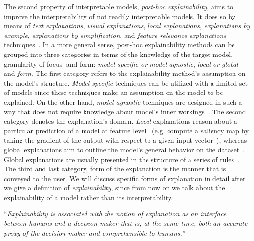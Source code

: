 The second property of interpretable models, \emph{post-hoc explainability}, aims to improve the interpretability of not readily interpretable models. It does so by means of \emph{text explanations}, \emph{visual explanations}, \emph{local explanations}, \emph{explanations by example},
\emph{explanations by simplification}, and \emph{feature relevance explanations} techniques~\parencite{TheMythosOfModelInterpretability_Lipton, XAIConceptsTaxonomies_Arrieta}. In a more general sense, post-hoc explainability methods can be grouped into three categories in terms of the knowledge of the target model, granularity of focus, and form: \emph{model-specific or model-agnostic}, \emph{local or global} and \emph{form}. The first category refers to the explainability method's assumption on the model's structure. \emph{Model-specific} techniques can be utilized with a limited set of models since these techniques make an assumption on the model to be explained. On the other hand, \emph{model-agnostic} techniques are designed in such a way that does not require knowledge about model's inner workings~\parencite{XAIConceptsTaxonomies_Arrieta,ASurveyOfMethodsForExplainingBlackBoxModels_Guidotti}. The second category denotes the explanation's domain. \emph{Local} explanations reason about a particular prediction of a model at feature level~\parencite{TowardsARigorousScienceML_Velez} (e.g. compute a saliency map by taking the gradient of the output with respect to a given input vector~\parencite{TheMythosOfModelInterpretability_Lipton}), whereas global explanations aim to outline the model's general behavior on the dataset~\parencite{XAIConceptsTaxonomies_Arrieta, ASurveyOfMethodsForExplainingBlackBoxModels_Guidotti,TowardsARigorousScienceML_Velez}. Global explanations are usually presented in the structure of a series of rules~\parencite{InterpretableDecisionSets_Lakkaraju}. The third and last category, form of the explanation is the manner that is conveyed to the user. We will discuss specific forms of explanation in detail after we give a definition of \emph{explainability}, since from now on we talk about the explainability of a model rather than its interpretability.
\begin{definition}[Explainability]
    “\emph{Explainability is associated with the notion of explanation as an interface between humans and a decision maker that is, at the same time, both an accurate proxy of the decision maker and comprehensible to humans.}”~\parencite{XAIConceptsTaxonomies_Arrieta, ASurveyOfMethodsForExplainingBlackBoxModels_Guidotti}
\end{definition}
